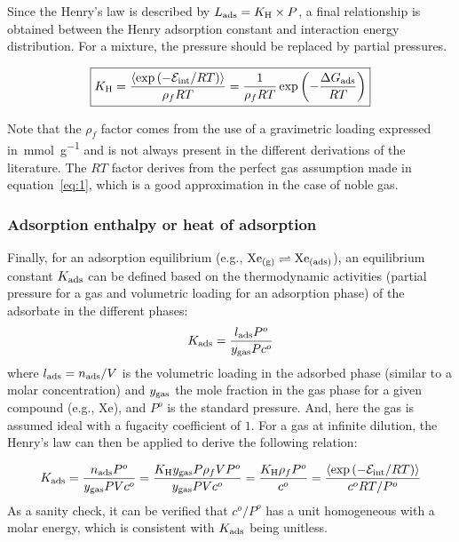 \documentclass[main.tex]{subfiles}
\begin{document}
Since the Henry's law is described by $L_{\text{ads}}=K_{\text{H}} \times P$, a final relationship is obtained between the Henry adsorption constant and interaction energy distribution. For a mixture, the pressure should be replaced by partial pressures.

\begin{equation}\label{eq:henry}
    \boxed{
    K_{\text{H}} = \dfrac{\langle \exp\left(-\mathcal{E}_{\text{int}}/RT\right) \rangle}{\rho_f RT} = \dfrac{1}{\rho_f RT} \exp\left(-\dfrac{\Delta G_{\text{ads}}}{RT}\right)
    }
\end{equation}

Note that the $\rho_f$ factor comes from the use of a gravimetric loading expressed in~\si{\milli\mole\per\gram} and is not always present in the different derivations of the literature.\autocite{PoreBlazer} The $RT$ factor derives from the perfect gas assumption made in equation~\ref{eq:1}, which is a good approximation in the case of noble gas. 


\subsubsection{Adsorption enthalpy or heat of adsorption}

Finally, for an adsorption equilibrium (e.g., $\text{Xe}_{\text{(g)}} \rightleftharpoons \text{Xe}_{\text{(ads)}}$), an equilibrium constant $K_{\text{ads}}$ can be defined based on the thermodynamic activities (partial pressure for a gas and volumetric loading for an adsorption phase) of the adsorbate in the different phases:
\begin{equation}
  K_{\text{ads}} = \dfrac{l_{\text{ads}}P^o}{y_{\text{gas}}Pc^o}
\end{equation}
where $l_{\text{ads}}=n_{\text{ads}}/V$ is the volumetric loading in the adsorbed phase (similar to a molar concentration) and $y_{\text{gas}}$ the mole fraction in the gas phase for a given compound (e.g., Xe), and $P^o$ is the standard pressure. And, here the gas is assumed ideal with a fugacity coefficient of $1$. For a gas at infinite dilution, the Henry's law can then be applied to derive the following relation:

\begin{equation}\label{eq:eq_cst}
  K_{\text{ads}} = \dfrac{n_{\text{ads}}P^o}{y_{\text{gas}}PVc^o} = \dfrac{K_{\text{H}}y_{\text{gas}}P\rho_f V P^o}{y_{\text{gas}}PVc^o} = \dfrac{K_{\text{H}}\rho_f P^o}{c^o} = \dfrac{\langle \exp\left(-\mathcal{E}_{\text{int}}/RT\right) \rangle}{c^o RT/P^o}
\end{equation}
As a sanity check, it can be verified that $c^o/P^o$ has a unit homogeneous with a molar energy, which is consistent with $K_{\text{ads}}$ being unitless.
\end{document}
